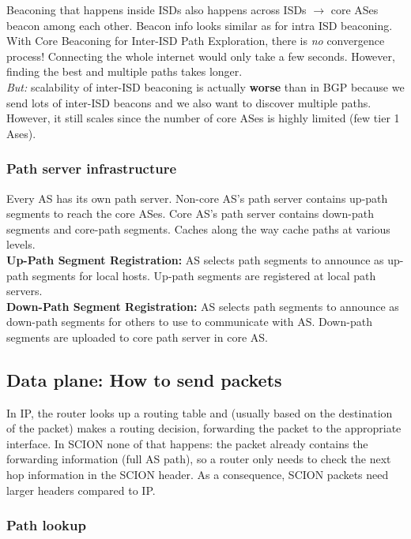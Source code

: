 \documentclass[11pt,oneside,a4paper]{article}
\begin{document}
Beaconing that happens inside ISDs also happens across ISDs $\rightarrow$ core ASes beacon among each other. Beacon info looks similar as for intra ISD beaconing. With Core Beaconing for Inter-ISD Path Exploration, there is \textit{no} convergence process! Connecting the whole internet would only take a few seconds. However, finding the best and multiple paths takes longer.\\
\textit{But:} scalability of inter-ISD beaconing is actually \textbf{worse} than in BGP because we send lots of inter-ISD beacons and we also want to discover multiple paths. However, it still scales since the number of core ASes is highly limited (few tier 1 Ases).

\subsubsection{Path server infrastructure}

Every AS has its own path server. Non-core AS's path server contains up-path segments to reach the core ASes. Core AS's path server contains down-path segments and core-path segments. Caches along the way cache paths at various levels.\\
\textbf{Up-Path Segment Registration:} AS selects path segments to announce
as up-path segments for local hosts. Up-path segments are registered at local path servers.\\
\textbf{Down-Path Segment Registration:} AS selects path segments to announce as down-path segments for others to use to communicate with AS. Down-path segments are uploaded to core path server in core AS.

\subsection{Data plane: How to send packets}

In IP, the router looks up a routing table and (usually based on the destination of the packet) makes a routing decision, forwarding the packet to the appropriate interface. In SCION none of that happens: the packet already contains the forwarding information (full AS path), so a router only needs to check the next hop information in the SCION header. As a consequence, SCION packets need larger headers compared to IP.

\subsubsection{Path lookup}
\end{document}
